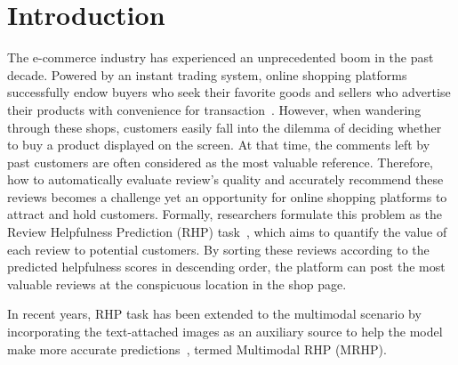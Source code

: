 \section{Introduction}
The e-commerce industry has experienced an unprecedented boom in the past decade.
Powered by an instant trading system, online shopping platforms successfully endow buyers who seek their favorite goods and sellers who advertise their products with convenience for transaction~\citep{boysen2019warehousing,vulkan2020economics,alfonso2021commerce}.
However, when wandering through these shops, customers easily fall into the dilemma of deciding whether to buy a product displayed on the screen.
At that time, the comments left by past customers are often considered as the most valuable reference.
Therefore, how to automatically evaluate review's quality and accurately recommend these reviews becomes a challenge yet an opportunity for online shopping platforms to attract and hold customers.
Formally, researchers formulate this problem as the Review Helpfulness Prediction (RHP) task~\citep{tang2013context,ngo2014influence}, which aims to quantify the value of each review to potential customers.
By sorting these reviews according to the predicted helpfulness scores in descending order, the platform can post the most valuable reviews at the conspicuous location in the shop page.

In recent years, RHP task has been extended to the multimodal scenario by incorporating the text-attached images as an auxiliary source to help the model make more accurate predictions~\citep{liu2021multi}, termed Multimodal RHP (MRHP).

